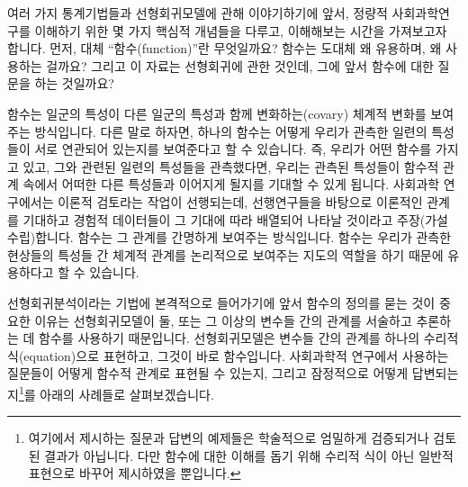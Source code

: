 \documentclass[
]{book}
\begin{document}
여러 가지 통계기법들과 선형회귀모델에 관해 이야기하기에 앞서, 정량적 사회과학연구를 이해하기 위한 몇 가지 핵심적 개념들을 다루고, 이해해보는 시간을 가져보고자 합니다. 먼저, 대체 ``함수(function)''란 무엇일까요? 함수는 도대체 왜 유용하며, 왜 사용하는 걸까요? 그리고 이 자료는 선형회귀에 관한 것인데, 그에 앞서 함수에 대한 질문을 하는 것일까요?

함수는 일군의 특성이 다른 일군의 특성과 함께 변화하는(covary) 체계적 변화를 보여주는 방식입니다. 다른 말로 하자면, 하나의 함수는 어떻게 우리가 관측한 일련의 특성들이 서로 연관되어 있는지를 보여준다고 할 수 있습니다. 즉, 우리가 어떤 함수를 가지고 있고, 그와 관련된 일련의 특성들을 관측했다면, 우리는 관측된 특성들이 함수적 관계 속에서 어떠한 다른 특성들과 이어지게 될지를 기대할 수 있게 됩니다. 사회과학 연구에서는 이론적 검토라는 작업이 선행되는데, 선행연구들을 바탕으로 이론적인 관계를 기대하고 경험적 데이터들이 그 기대에 따라 배열되어 나타날 것이라고 주장(가설 수립)합니다. 함수는 그 관계를 간명하게 보여주는 방식입니다. 함수는 우리가 관측한 현상들의 특성들 간 체계적 관계를 논리적으로 보여주는 지도의 역할을 하기 때문에 유용하다고 할 수 있습니다.

선형회귀분석이라는 기법에 본격적으로 들어가기에 앞서 함수의 정의를 묻는 것이 중요한 이유는 선형회귀모델이 둘, 또는 그 이상의 변수들 간의 관계를 서술하고 추론하는 데 함수를 사용하기 때문입니다. 선형회귀모델은 변수들 간의 관계를 하나의 수리적 식(equation)으로 표현하고, 그것이 바로 함수입니다. 사회과학적 연구에서 사용하는 질문들이 어떻게 함수적 관계로 표현될 수 있는지, 그리고 잠정적으로 어떻게 답변되는지\footnote{여기에서 제시하는 질문과 답변의 예제들은 학술적으로 엄밀하게 검증되거나 검토된 결과가 아닙니다. 다만 함수에 대한 이해를 돕기 위해 수리적 식이 아닌 일반적 표현으로 바꾸어 제시하였을 뿐입니다.}를 아래의 사례들로 살펴보겠습니다.
\end{document}
